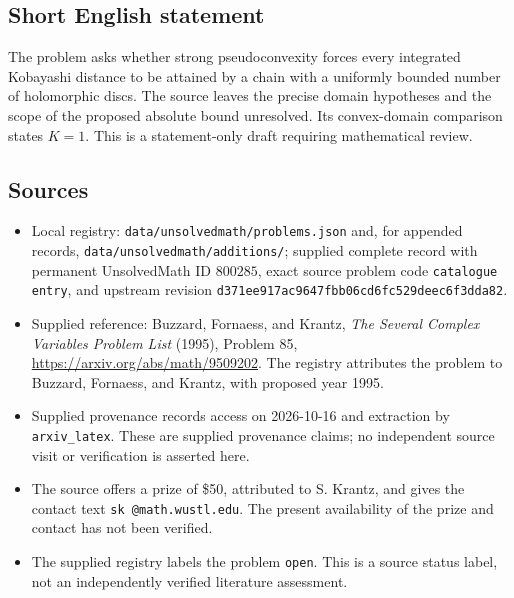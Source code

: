 \documentclass[11pt]{article}
\begin{document}
\subsection{Short English statement}
The problem asks whether strong pseudoconvexity forces every integrated Kobayashi distance to be attained by a chain with a uniformly bounded number of holomorphic discs. The source leaves the precise domain hypotheses and the scope of the proposed absolute bound unresolved. Its convex-domain comparison states \(K=1\). This is a statement-only draft requiring mathematical review.
\subsection{Sources}
\begin{itemize}
\item Local registry: \texttt{data/unsolvedmath/problems.json} and, for appended records, \texttt{data/unsolvedmath/additions/}; supplied complete record with permanent UnsolvedMath ID \(800285\), exact source problem code \texttt{catalogue entry}, and upstream revision \texttt{d371ee917ac9647fbb06cd6fc529deec6f3dda82}.
\item Supplied reference: Buzzard, Fornaess, and Krantz, \emph{The Several Complex Variables Problem List} (1995), Problem 85, \url{https://arxiv.org/abs/math/9509202}. The registry attributes the problem to Buzzard, Fornaess, and Krantz, with proposed year 1995.
\item Supplied provenance records access on 2026-10-16 and extraction by \texttt{arxiv\_latex}. These are supplied provenance claims; no independent source visit or verification is asserted here.
\item The source offers a prize of \$50, attributed to S. Krantz, and gives the contact text \texttt{sk @math.wustl.edu}. The present availability of the prize and contact has not been verified.
\item The supplied registry labels the problem \texttt{open}. This is a source status label, not an independently verified literature assessment.
\end{itemize}
\end{document}
